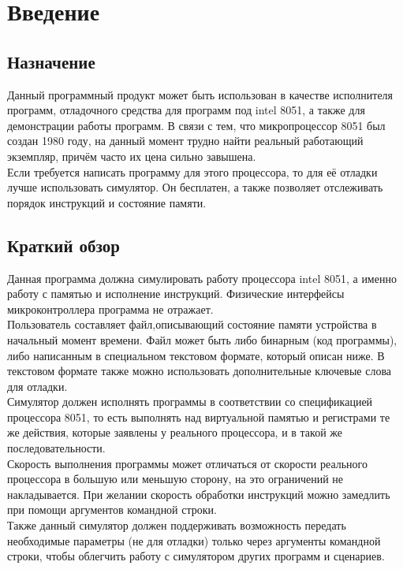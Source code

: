 





\large



\tableofcontents
\newpage


\section{Введение}
\subsection{Назначение}
Данный программный продукт может быть использован в качестве исполнителя программ, отладочного средства для программ под intel 8051, а также для демонстрации работы программ. В связи с тем, что микропроцессор 8051 был создан 1980 году, на данный момент трудно найти реальный работающий экземпляр, причём часто их цена сильно завышена.\\
Если требуется написать программу для этого процессора, то для её отладки лучше использовать симулятор. Он бесплатен, а также позволяет отслеживать порядок инструкций и состояние памяти.\\
\subsection{Краткий обзор}
Данная программа должна симулировать работу процессора intel 8051, а именно работу с памятью и исполнение инструкций. Физические интерфейсы микроконтроллера программа не отражает.\\
Пользователь составляет файл,описывающий состояние памяти устройства в начальный момент времени. Файл может быть либо бинарным (код программы), либо написанным в специальном текстовом формате, который описан ниже. В текстовом формате также можно использовать дополнительные ключевые слова для отладки.\\
Симулятор должен исполнять программы в соответствии со спецификацией процессора 8051, то есть выполнять над виртуальной памятью и регистрами те же действия, которые заявлены у реального процессора, и в такой же последовательности. \\
Скорость выполнения программы может отличаться от скорости реального процессора в большую или меньшую сторону, на это ограничений не накладывается.
При желании скорость обработки инструкций можно замедлить при помощи аргументов командной строки. \\
Также данный симулятор должен поддерживать возможность передать необходимые параметры (не для отладки) только через аргументы командной строки, чтобы облегчить работу с симулятором других программ и сценариев.
